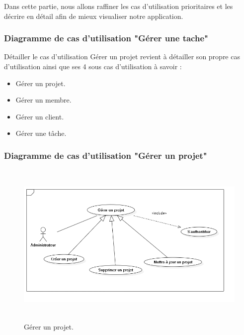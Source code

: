 






Dans cette partie, nous allons raffiner les cas d’utilisation prioritaires et les
décrire en détail afin de mieux visualiser notre application.



\subsubsection{ Diagramme de cas d'utilisation "G\'{e}rer une tache"}
D\'{e}tailler le cas d'utilisation \guillemotleft{}G\'{e}rer un projet \guillemotright{} revient \`{a} d\'{e}tailler son propre
cas d'utilisation ainsi que ses 4 sous cas d'utilisation \`{a} savoir :

\begin{itemize}
\item{ G\'{e}rer un projet.}
\item{ G\'{e}rer  un membre.}
\item{ G\'{e}rer un client.}
\item{ G\'{e}rer  une t\^{a}che.}
\end{itemize}

\subsubsection{ Diagramme de cas d'utilisation "G\'{e}rer un projet"}

\begin{figure}[H]
\center
\includegraphics[width=13cm,height=8cm]{./figures/ucP.png}
\caption{G\'{e}rer un projet.}

\end{figure}





